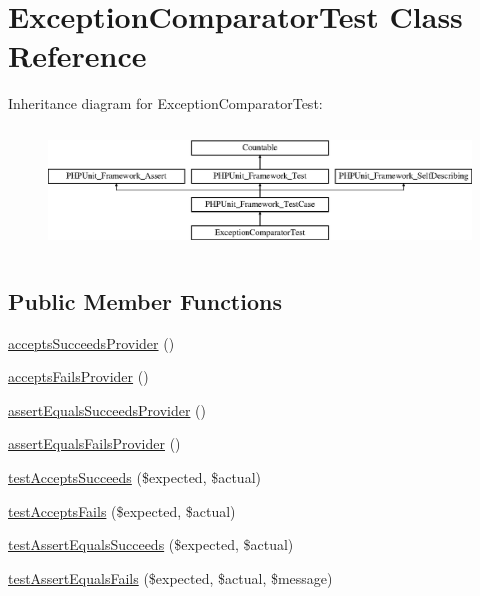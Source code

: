 \hypertarget{class_sebastian_bergmann_1_1_comparator_1_1_exception_comparator_test}{}\section{Exception\+Comparator\+Test Class Reference}
\label{class_sebastian_bergmann_1_1_comparator_1_1_exception_comparator_test}
Inheritance diagram for Exception\+Comparator\+Test\+:\begin{figure}[H]
\begin{center}
\leavevmode
\includegraphics[height=3.303835cm]{class_sebastian_bergmann_1_1_comparator_1_1_exception_comparator_test}
\end{center}
\end{figure}
\subsection*{Public Member Functions}
\begin{DoxyCompactItemize}
\item 
\mbox{\hyperlink{class_sebastian_bergmann_1_1_comparator_1_1_exception_comparator_test_a2ca71e8095ac10e058cd9d7a68da8608}{accepts\+Succeeds\+Provider}} ()
\item 
\mbox{\hyperlink{class_sebastian_bergmann_1_1_comparator_1_1_exception_comparator_test_a9ea19e26cacbca06356c2f229079f8a1}{accepts\+Fails\+Provider}} ()
\item 
\mbox{\hyperlink{class_sebastian_bergmann_1_1_comparator_1_1_exception_comparator_test_acb6bc1b6e9d32990bdd287f8b590a5fa}{assert\+Equals\+Succeeds\+Provider}} ()
\item 
\mbox{\hyperlink{class_sebastian_bergmann_1_1_comparator_1_1_exception_comparator_test_a3cc10e39239b6e3f3fda1d34c0fb1c14}{assert\+Equals\+Fails\+Provider}} ()
\item 
\mbox{\hyperlink{class_sebastian_bergmann_1_1_comparator_1_1_exception_comparator_test_a907ea73398b22f4a8cf37728cfc981e3}{test\+Accepts\+Succeeds}} (\$expected, \$actual)
\item 
\mbox{\hyperlink{class_sebastian_bergmann_1_1_comparator_1_1_exception_comparator_test_afe5eff1a1b7049f973a035117a7e0df1}{test\+Accepts\+Fails}} (\$expected, \$actual)
\item 
\mbox{\hyperlink{class_sebastian_bergmann_1_1_comparator_1_1_exception_comparator_test_afb51e0f06ccb75cc8ad5b284a2e0c4cc}{test\+Assert\+Equals\+Succeeds}} (\$expected, \$actual)
\item 
\mbox{\hyperlink{class_sebastian_bergmann_1_1_comparator_1_1_exception_comparator_test_a22eae8d48f386273d598d4fc73bc2476}{test\+Assert\+Equals\+Fails}} (\$expected, \$actual, \$message)
\end{DoxyCompactItemize}
